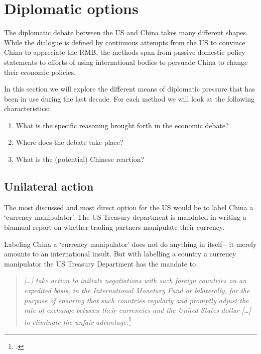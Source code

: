 \section{Diplomatic options}
\label{sec:diplomacy}

The diplomatic debate between the US and China takes many different 
shapes. While the dialogue is defined by continuous attempts from the US 
to convince China to appreciate the RMB, the methods span from passive 
domestic policy statements to efforts of using international bodies to 
persuade China to change their economic policies.

In this section we will explore the different means of diplomatic 
pressure that has been in use during the last decade. For each method we 
will look at the following characteristics:

\begin{enumerate}
	\item{What is the specific reasoning brought 
		forth in the economic debate?}
	\item{Where does the debate take 
		place?}
	\item{What is the (potential) Chinese reaction?}
\end{enumerate}



\subsection{Unilateral action}

The most discussed and most direct option for the US would be to label 
China a `currency manipulator'. The US Treasury department is mandated 
in writing a biannual report on whether trading partners manipulate 
their currency.  

Labeling China a `currency manipulator' does not do anything in itself - 
it merely amounts to an international insult. But with labelling a 
country a currency manipulator the US Treasury Department has the 
mandate to
\begin{quotation}
\emph{[\dots] take action to initiate negotiations with such foreign 
	countries on an expedited basis, in the International Monetary Fund 
	or bilaterally, for the purpose of ensuring that such countries 
	regularly and promptly adjust the rate of exchange between their 
	currencies and the United States dollar [\dots] to eliminate the 
unfair advantage.}\footnote{\cite{TradeAct1988}.}
\end{quotation}

